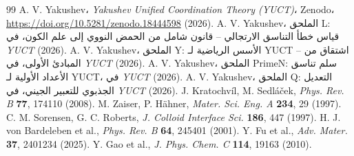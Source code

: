 \documentclass[11pt,a4paper]{article}
\begin{document}
	\begin{thebibliography}{99}
		A. V. Yakushev، \emph{Yakushev Unified Coordination Theory (YUCT)}، Zenodo، \url{https://doi.org/10.5281/zenodo.18444598} (2026).
		A. V. Yakushev، الملحق L: قياس خطأ التناسق الارتجالي -- قانون شامل من الحمض النووي إلى علم الكون، في \emph{YUCT} (2026).
		A. V. Yakushev، الملحق Y: الأسس الرياضية لـ YUCT -- اشتقاق من المبادئ الأولى، في \emph{YUCT} (2026).
		A. V. Yakushev، الملحق PrimeN: سلم تناسق الأعداد الأولية لـ YUCT، في \emph{YUCT} (2026).
		A. V. Yakushev، الملحق Q: التعديل الجذبوي للتعبير الجيني، في \emph{YUCT} (2026).
		J. Kratochv\'il, M. Sedl\'a\v{c}ek, \emph{Phys. Rev. B} \textbf{77}, 174110 (2008).
		M. Zaiser, P. H\"ahner, \emph{Mater. Sci. Eng. A} \textbf{234}, 29 (1997).
		C. M. Sorensen, G. C. Roberts, \emph{J. Colloid Interface Sci.} \textbf{186}, 447 (1997).
		H. J. von Bardeleben et al., \emph{Phys. Rev. B} \textbf{64}, 245401 (2001).
		Y. Fu et al., \emph{Adv. Mater.} \textbf{37}, 2401234 (2025).
		Y. Gao et al., \emph{J. Phys. Chem. C} \textbf{114}, 19163 (2010).
	\end{thebibliography}
	
\end{document}
